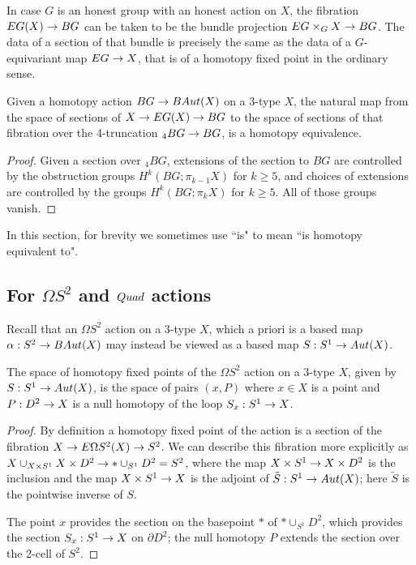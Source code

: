 \documentclass{amsart}
\begin{document}
\begin{remark}
In case $G$ is an honest group with an honest action on $X$, the fibration $EG(X) \rightarrow BG$ can be taken to be the bundle projection $EG \times_G X \rightarrow BG$.  The data of a section of that bundle is precisely the same as the data of a $G$-equivariant map $EG \rightarrow X$, that is of a homotopy fixed point in the ordinary sense.
\end{remark}

\begin{proposition} 
\label{prop-hofptrunc}
Given a homotopy action $BG \rightarrow BAut(X)$ on a 3-type $X$, the natural map from the space of sections of $X \rightarrow EG(X) \rightarrow BG$ to the space of sections of that fibration over the 4-truncation ${}_4 BG \rightarrow BG$, is a homotopy equivalence.
\end{proposition}
\begin{proof}
Given a section over ${}_4 BG$, extensions of the section to $BG$ are controlled by the obstruction groups $H^k(BG;\pi_{k-1} X)$ for $k \geq 5$, and choices of extensions are controlled by the groups $H^k(BG;\pi_k X)$ for $k \geq 5$.  All of those groups vanish.
\end{proof}

In this section, for brevity we sometimes use ``is" to mean ``is homotopy equivalent to".

\subsection{For $\Omega S^2$ and $Quad$ actions}

Recall that an $\Omega S^2$ action on a 3-type $X$, which a priori is a based map $\alpha: S^2 \rightarrow BAut(X)$ may instead be viewed as a based map $S: S^1 \rightarrow Aut(X)$.

\begin{proposition}
The space of homotopy fixed points of the $\Omega S^2$ action on a 3-type $X$, given by $S: S^1 \rightarrow Aut(X)$, is the space of pairs $(x,P)$ where $x \in X$ is a point and $P: D^2 \rightarrow X$ is a null homotopy of the loop $S_x: S^1 \rightarrow X$.
\end{proposition}
\begin{proof}
By definition a homotopy fixed point of the action is a section of the fibration $X \rightarrow E\Omega S^2(X) \rightarrow S^2$.  We can describe this fibration more explicitly as $X \cup_{X \times S^1} X \times D^2 \rightarrow \ast \cup_{S^1} D^2 = S^2$, where the map $X \times S^1 \rightarrow X \times D^2$ is the inclusion and the map $X \times S^1 \rightarrow X$ is the adjoint of $\tilde{S}: S^1 \rightarrow Aut(X)$; here $\tilde{S}$ is the pointwise inverse of $S$.  %

The point $x$ provides the section on the basepoint $\ast$ of $\ast \cup_{S^1} D^2$, which provides the section $S_x: S^1 \rightarrow X$ on $\partial D^2$; the null homotopy $P$ extends the section over the 2-cell of $S^2$.
\end{proof}
\end{document}

